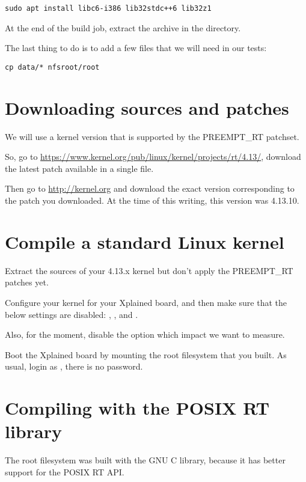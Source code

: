 \begin{verbatim}
sudo apt install libc6-i386 lib32stdc++6 lib32z1
\end{verbatim}

At the end of the build job, extract the
 archive in the 
directory.

The last thing to do is to add a few files that we will need in our
tests:

\begin{verbatim}
cp data/* nfsroot/root
\end{verbatim}

\section{Downloading sources and patches}

We will use a kernel version that is supported by the PREEMPT\_RT
patchset.

So, go to
\url{https://www.kernel.org/pub/linux/kernel/projects/rt/4.13/},
download the latest patch available in a single file.

Then go to \url{http://kernel.org} and download the exact version
corresponding to the patch you downloaded. At the time of this writing,
this version was 4.13.10.

\section{Compile a standard Linux kernel}

Extract the sources of your 4.13.x kernel but don't apply the
PREEMPT\_RT patches yet.

Configure your kernel for your Xplained board, and then make sure
that the below settings are disabled:
, ,
 and .

Also, for the moment, disable the 
option which impact we want to measure.

Boot the Xplained board by mounting the root filesystem that you
built. As usual, login as , there is no password.

\section{Compiling with the POSIX RT library}

The root filesystem was built with the GNU C library, because it has
better support for the POSIX RT API.


